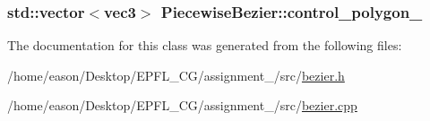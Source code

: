 \subsubsection[{\texorpdfstring{control\+\_\+polygon\+\_\+}{control_polygon_}}]{\setlength{\rightskip}{0pt plus 5cm}std\+::vector$<${\bf vec3}$>$ Piecewise\+Bezier\+::control\+\_\+polygon\+\_\+\hspace{0.3cm}{\ttfamily [private]}}\hypertarget{classPiecewiseBezier_a7195de7263e5f4d7761d4c528b1a846d}{}\label{classPiecewiseBezier_a7195de7263e5f4d7761d4c528b1a846d}


The documentation for this class was generated from the following files\+:\begin{DoxyCompactItemize}
\item 
/home/eason/\+Desktop/\+E\+P\+F\+L\+\_\+\+C\+G/assignment\+\_/src/\hyperlink{bezier_8h}{bezier.\+h}\item 
/home/eason/\+Desktop/\+E\+P\+F\+L\+\_\+\+C\+G/assignment\+\_/src/\hyperlink{bezier_8cpp}{bezier.\+cpp}\end{DoxyCompactItemize}
